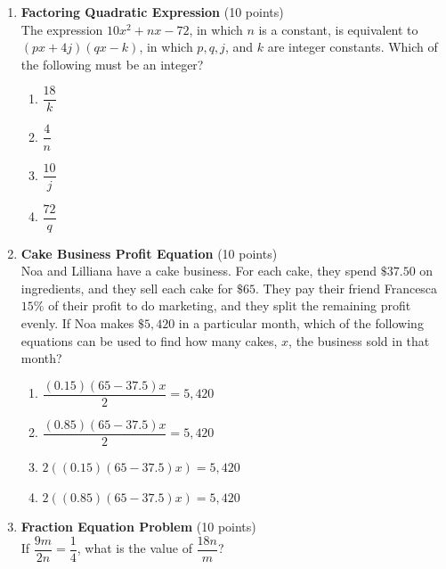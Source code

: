 \begin{enumerate}
  \item \textbf{Factoring Quadratic Expression} (10 points)\\
  The expression $10 x^2+n x-72$, in which $n$ is a constant, is equivalent to $(p x+4 j)(q x-k)$, 
  in which $p, q, j$, and $k$ are integer constants. Which of the following must be an integer?
  \begin{enumerate}[label=(\Alph*)]
    \item $\dfrac{18}{k}$
    \item $\dfrac{4}{n}$
    \item $\dfrac{10}{j}$
    \item $\dfrac{72}{q}$
  \end{enumerate}
  \begin{subanswer}
  \end{subanswer}


  \item \textbf{Cake Business Profit Equation} (10 points)\\
  Noa and Lilliana have a cake business. For each cake, they spend $\$37.50$ on ingredients, 
  and they sell each cake for $\$65$. They pay their friend Francesca $15\%$ of their profit 
  to do marketing, and they split the remaining profit evenly. If Noa makes $\$5,420$ in a 
  particular month, which of the following equations can be used to find how many cakes, $x$, 
  the business sold in that month?
  \begin{enumerate}[label=(\Alph*)]
    \item $\dfrac{(0.15)(65-37.5)x}{2}=5,420$
    \item $\dfrac{(0.85)(65-37.5)x}{2}=5,420$
    \item $2((0.15)(65-37.5)x)=5,420$
    \item $2((0.85)(65-37.5)x)=5,420$
  \end{enumerate}
  \begin{subanswer}
  \end{subanswer}




  \item \textbf{Fraction Equation Problem} (10 points)\\
  If $\dfrac{9 m}{2 n}=\dfrac{1}{4}$, what is the value of $\dfrac{18 n}{m}$?
  \begin{subanswer}
  \end{subanswer}


\end{enumerate}
